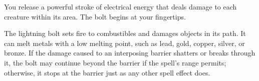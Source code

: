 \begin{spelleffect}
  You release a powerful stroke of electrical energy that deals damage to each creature within its area. The bolt begins at your fingertips.
  \par The lightning bolt sets fire to combustibles and damages objects in its path. It can melt metals with a low melting point, such as lead, gold, copper, silver, or bronze. If the damage caused to an interposing barrier shatters or breaks through it, the bolt may continue beyond the barrier if the spell's range permits; otherwise, it stops at the barrier just as any other spell effect does.
\end{spelleffect}

